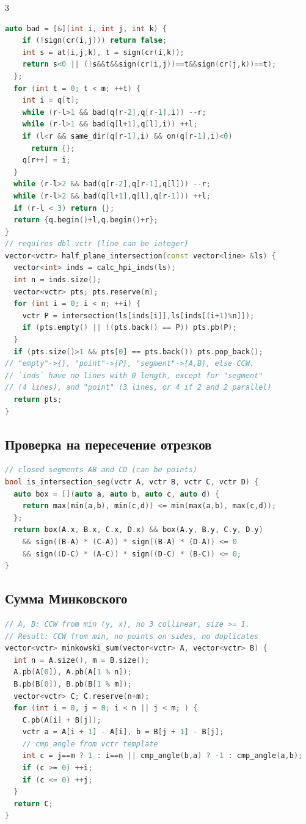 \documentclass[8pt,a4paper,landscape,twosided]{extarticle}
\begin{document}
\begin{multicols*}{3}
\begin{lstlisting}[language=C++]
  auto bad = [&](int i, int j, int k) {
    if (!sign(cr(i,j))) return false;
    int s = at(i,j,k), t = sign(cr(i,k));
    return s<0 || (!s&&t&&sign(cr(i,j))==t&&sign(cr(j,k))==t);
  };
  for (int t = 0; t < m; ++t) {
    int i = q[t];
    while (r-l>1 && bad(q[r-2],q[r-1],i)) --r;
    while (r-l>1 && bad(q[l+1],q[l],i)) ++l;
    if (l<r && same_dir(q[r-1],i) && on(q[r-1],i)<0)
      return {};
    q[r++] = i;
  }
  while (r-l>2 && bad(q[r-2],q[r-1],q[l])) --r;
  while (r-l>2 && bad(q[l+1],q[l],q[r-1])) ++l;
  if (r-l < 3) return {};
  return {q.begin()+l,q.begin()+r};
}
// requires dbl vctr (line can be integer)
vector<vctr> half_plane_intersection(const vector<line> &ls) {
  vector<int> inds = calc_hpi_inds(ls);
  int n = inds.size();
  vector<vctr> pts; pts.reserve(n);
  for (int i = 0; i < n; ++i) {
    vctr P = intersection(ls[inds[i]],ls[inds[(i+1)%n]]);
    if (pts.empty() || !(pts.back() == P)) pts.pb(P);
  }
  if (pts.size()>1 && pts[0] == pts.back()) pts.pop_back();
// "empty"->{}, "point"->{P}, "segment"->{A,B}, else CCW.
// `inds` have no lines with 0 length, except for "segment"
// (4 lines), and "point" (3 lines, or 4 if 2 and 2 parallel)
  return pts;
}
\end{lstlisting}

\subsection{Проверка на пересечение отрезков}
\begin{lstlisting}[language=C++]
// closed segments AB and CD (can be points)
bool is_intersection_seg(vctr A, vctr B, vctr C, vctr D) {
  auto box = [](auto a, auto b, auto c, auto d) {
    return max(min(a,b), min(c,d)) <= min(max(a,b), max(c,d));
  };
  return box(A.x, B.x, C.x, D.x) && box(A.y, B.y, C.y, D.y)
    && sign((B-A) * (C-A)) * sign((B-A) * (D-A)) <= 0
    && sign((D-C) * (A-C)) * sign((D-C) * (B-C)) <= 0;
}
\end{lstlisting}

\subsection{Сумма Минковского}
\begin{lstlisting}[language=C++]
// A, B: CCW from min (y, x), no 3 collinear, size >= 1.
// Result: CCW from min, no points on sides, no duplicates
vector<vctr> minkowski_sum(vector<vctr> A, vector<vctr> B) {
  int n = A.size(), m = B.size();
  A.pb(A[0]), A.pb(A[1 % n]);
  B.pb(B[0]), B.pb(B[1 % m]);
  vector<vctr> C; C.reserve(n+m);
  for (int i = 0, j = 0; i < n || j < m; ) {
    C.pb(A[i] + B[j]);
    vctr a = A[i + 1] - A[i], b = B[j + 1] - B[j];
    // cmp_angle from vctr template
    int c = j==m ? 1 : i==n || cmp_angle(b,a) ? -1 : cmp_angle(a,b);
    if (c >= 0) ++i;
    if (c <= 0) ++j;
  }
  return C;
}
\end{lstlisting}


\end{multicols*}
\end{document}
